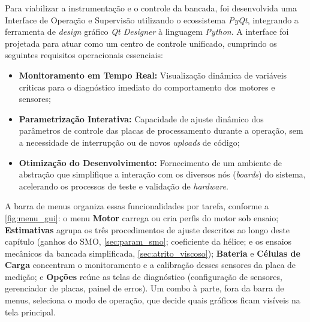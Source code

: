 Para viabilizar a instrumentação e o controle da bancada, foi desenvolvida uma Interface de Operação e Supervisão utilizando o ecossistema \textit{PyQt}, integrando a ferramenta de \textit{design} gráfico \textit{Qt Designer} à linguagem \textit{Python}. A interface foi projetada para atuar como um centro de controle unificado, cumprindo os seguintes requisitos operacionais essenciais:

\begin{itemize}
    \item \textbf{Monitoramento em Tempo Real:} Visualização dinâmica de variáveis críticas para o diagnóstico imediato do comportamento dos motores e sensores;
    \item \textbf{Parametrização Interativa:} Capacidade de ajuste dinâmico dos parâmetros de controle das placas de processamento durante a operação, sem a necessidade de interrupção ou de novos \textit{uploads} de código;
    \item \textbf{Otimização do Desenvolvimento:} Fornecimento de um ambiente de abstração que simplifique a interação com os diversos nós (\textit{boards}) do sistema, acelerando os processos de teste e validação de \textit{hardware}.
\end{itemize}

A barra de menus organiza essas funcionalidades por tarefa, conforme a
\autoref{fig:menu_gui}: o menu \textbf{Motor} carrega ou cria perfis do motor
sob ensaio; \textbf{Estimativas} agrupa os três procedimentos de ajuste
descritos ao longo deste capítulo (ganhos do SMO, \autoref{sec:param_smo};
coeficiente da hélice; e os ensaios mecânicos da bancada simplificada,
\autoref{sec:atrito_viscoso}); \textbf{Bateria} e \textbf{Células de Carga}
concentram o monitoramento e a calibração desses sensores da placa de medição; e
\textbf{Opções} reúne as telas de diagnóstico (configuração de sensores,
gerenciador de placas, painel de erros). Um combo à parte, fora da barra de
menus, seleciona o modo de operação, que decide quais gráficos ficam visíveis
na tela principal.

